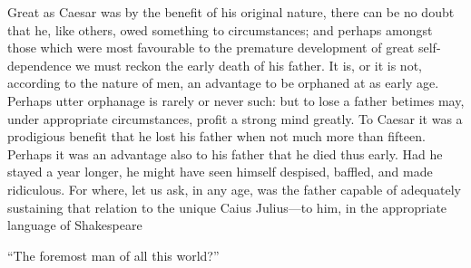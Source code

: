 Great as Caesar was by the benefit of his original nature, there can be
no doubt that he, like others, owed something to circumstances; and
perhaps amongst those which were most favourable to the premature
development of great self-dependence we must reckon the early death of
his father. It is, or it is not, according to the nature of men, an
advantage to be orphaned at as early age. Perhaps utter orphanage is
rarely or never such: but to lose a father betimes may, under
appropriate circumstances, profit a strong mind greatly. To Caesar it
was a prodigious benefit that he lost his father when not much more than
fifteen. Perhaps it was an advantage also to his father that he died
thus early. Had he stayed a year longer, he might have seen himself
despised, baffled, and made ridiculous. For where, let us ask, in any
age, was the father capable of adequately sustaining that relation to
the unique Caius Julius—to him, in the appropriate language of
Shakespeare

``The foremost man of all this world?''

